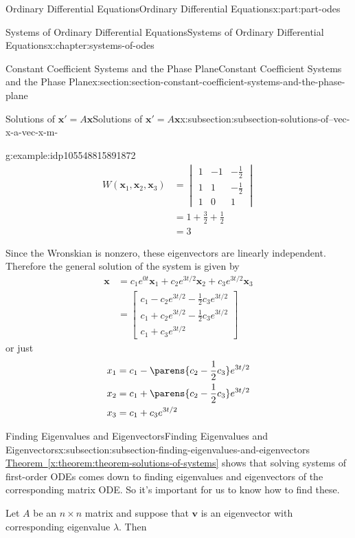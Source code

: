 \documentclass[twoside,10pt,]{book}
\newcommand{\xreffont}{\relax}
\numberwithin{equation}{part}
\renewcommand{\vec}[1]{\mathbf{#1}}
\newcommand{\amp}{&}
\begin{document}
\begin{partptx}{Ordinary Differential Equations}{}{Ordinary Differential Equations}{}{}{x:part:part-odes}
\begin{chapterptx}{Systems of Ordinary Differential Equations}{}{Systems of Ordinary Differential Equations}{}{}{x:chapter:systems-of-odes}
\begin{sectionptx}{Constant Coefficient Systems and the Phase Plane}{}{Constant Coefficient Systems and the Phase Plane}{}{}{x:section:section-constant-coefficient-systems-and-the-phase-plane}
\begin{subsectionptx}{Solutions of \(\vec{x}' = A\vec{x}\)}{}{Solutions of \(\vec{x}' = A\vec{x}\)}{}{}{x:subsection:subsection-solutions-of--vec-x-a-vec-x-m-}
\begin{example}{}{g:example:idp105548815891872}
\begin{align*}
W(\vec{x}_{1},\vec{x}_{2},\vec{x}_{3}) \amp = \begin{vmatrix} 1  \amp  -1  \amp  -\frac{1}{2} \\ 1 \amp  1 \amp  -\frac{1}{2} \\ 1 \amp  0 \amp  1\end{vmatrix}\\
\amp = 1+\frac{3}{2}+\frac{1}{2}\\
\amp = 3
\end{align*}
%
\par
Since the Wronskian is nonzero, these eigenvectors are linearly independent. Therefore the general solution of the system is given by%
\begin{align*}
\vec{x} \amp = c_{1}e^{0t}\vec{x}_{1}+c_{2}e^{3t/2}\vec{x}_{2}+c_{3}e^{3t/2}\vec{x}_{3}\\
\amp = \begin{bmatrix}c_{1}-c_{2}e^{3t/2}-\frac{1}{2}c_{3}e^{3t/2} \\ c_{1}+c_{2}e^{3t/2}-\frac{1}{2}c_{3}e^{3t/2} \\ c_{1}+c_{3}e^{3t/2}\end{bmatrix}
\end{align*}
or just%
\begin{align*}
x_{1} \amp = c_{1}-\parens{c_{2}-\frac{1}{2}c_{3}}e^{3t/2}\\
x_{2} \amp = c_{1}+\parens{c_{2}-\frac{1}{2}c_{3}}e^{3t/2}\\
x_{3} \amp = c_{1}+c_{3}e^{3t/2}
\end{align*}
%
\end{example}
\end{subsectionptx}
%
%
\typeout{************************************************}
\typeout{************************************************}
%
\begin{subsectionptx}{Finding Eigenvalues and Eigenvectors}{}{Finding Eigenvalues and Eigenvectors}{}{}{x:subsection:subsection-finding-eigenvalues-and-eigenvectors}
\hyperref[x:theorem:theorem-solutions-of-systems]{Theorem~{\xreffont\ref{x:theorem:theorem-solutions-of-systems}}} shows that solving systems of first-order ODEs comes down to finding eigenvalues and eigenvectors of the corresponding matrix ODE. So it's important for us to know how to find these.%
\par
Let \(A\) be an \(n\times n\) matrix and suppose that \(\vec{v}\) is an eigenvector with corresponding eigenvalue \(\lambda\). Then%
\begin{equation*}

\end{equation*}
\end{subsectionptx}
\end{sectionptx}
\end{chapterptx}
\end{partptx}
\end{document}
